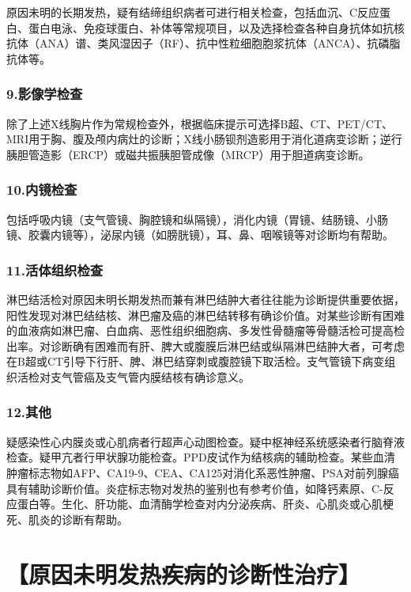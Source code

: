 原因未明的长期发热，疑有结缔组织病者可进行相关检查，包括血沉、C反应蛋白、蛋白电泳、免疫球蛋白、补体等常规项目，以及选择检查各种自身抗体如抗核抗体（ANA）谱、类风湿因子（RF）、抗中性粒细胞胞浆抗体（ANCA）、抗磷脂抗体等。

\subsubsection{9.影像学检查}

除了上述X线胸片作为常规检查外，根据临床提示可选择B超、CT、PET/CT、MRI用于胸、腹及颅内病灶的诊断；X线小肠钡剂造影用于消化道病变诊断；逆行胰胆管造影（ERCP）或磁共振胰胆管成像（MRCP）用于胆道病变诊断。

\subsubsection{10.内镜检查}

包括呼吸内镜（支气管镜、胸腔镜和纵隔镜），消化内镜（胃镜、结肠镜、小肠镜、胶囊内镜等），泌尿内镜（如膀胱镜），耳、鼻、咽喉镜等对诊断均有帮助。

\subsubsection{11.活体组织检查}

淋巴结活检对原因未明长期发热而兼有淋巴结肿大者往往能为诊断提供重要依据，阳性发现对淋巴结结核、淋巴瘤及癌的淋巴结转移有确诊价值。对某些诊断有困难的血液病如淋巴瘤、白血病、恶性组织细胞病、多发性骨髓瘤等骨髓活检可提高检出率。对诊断确有困难而有肝、脾大或腹膜后淋巴结或纵隔淋巴结肿大者，可考虑在B超或CT引导下行肝、脾、淋巴结穿刺或腹腔镜下取活检。支气管镜下病变组织活检对支气管癌及支气管内膜结核有确诊意义。

\subsubsection{12.其他}

疑感染性心内膜炎或心肌病者行超声心动图检查。疑中枢神经系统感染者行脑脊液检查。疑甲亢者行甲状腺功能检查。PPD皮试作为结核病的辅助检查。某些血清肿瘤标志物如AFP、CA19-9、CEA、CA125对消化系恶性肿瘤、PSA对前列腺癌具有辅助诊断价值。炎症标志物对发热的鉴别也有参考价值，如降钙素原、C-反应蛋白等。生化、肝功能、血清酶学检查对内分泌疾病、肝炎、心肌炎或心肌梗死、肌炎的诊断有帮助。

\section{【原因未明发热疾病的诊断性治疗】}

